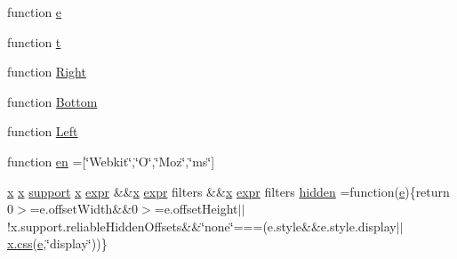 \begin{DoxyCompactItemize}
\item 
function \hyperlink{packages_2j_query_81_810_82_2_content_2_scripts_2jquery-1_810_82_8min_8js_a2c038346d47955cbe2cb91e338edd7e1}{e}
\item 
function \hyperlink{packages_2j_query_81_810_82_2_content_2_scripts_2jquery-1_810_82_8min_8js_a23c5666e83bbbceee94adcd0851f50c4}{t}
\item 
function \hyperlink{packages_2j_query_81_810_82_2_content_2_scripts_2jquery-1_810_82_8min_8js_ac7f66efc33d974809d85fc5bdb00c6eb}{Right}
\item 
function \hyperlink{packages_2j_query_81_810_82_2_content_2_scripts_2jquery-1_810_82_8min_8js_aff76c1cba4a00c678dfce0e0c5a5538a}{Bottom}
\item 
function \hyperlink{packages_2j_query_81_810_82_2_content_2_scripts_2jquery-1_810_82_8min_8js_abef68bf244a1159a49fe3a2c153a65d2}{Left}
\item 
function \hyperlink{packages_2j_query_81_810_82_2_content_2_scripts_2jquery-1_810_82_8min_8js_a5d7a777130eac935addcf4926a74b23c}{en} =\mbox{[}\char`\"{}Webkit\char`\"{},\char`\"{}O\char`\"{},\char`\"{}Moz\char`\"{},\char`\"{}ms\char`\"{}\mbox{]}
\item 
\hyperlink{packages_2j_query_81_810_82_2_content_2_scripts_2jquery-1_810_82_8min_8js_a5ce50d751c9664d05375c8f5080ed43e}{x} \hyperlink{packages_2j_query_81_810_82_2_content_2_scripts_2jquery-1_810_82_8min_8js_a5ce50d751c9664d05375c8f5080ed43e}{x} \hyperlink{jquery-1_810_82-vsdoc_8js_a1be69652377630fc5432ae5ec6463744}{support} \hyperlink{packages_2j_query_81_810_82_2_content_2_scripts_2jquery-1_810_82_8min_8js_a5ce50d751c9664d05375c8f5080ed43e}{x} \hyperlink{jquery-1_810_82-vsdoc_8js_aaacd1d5b3593ba4dfff6d67d4f6cfda1}{expr} \&\&\hyperlink{packages_2j_query_81_810_82_2_content_2_scripts_2jquery-1_810_82_8min_8js_a5ce50d751c9664d05375c8f5080ed43e}{x} \hyperlink{jquery-1_810_82-vsdoc_8js_aaacd1d5b3593ba4dfff6d67d4f6cfda1}{expr} filters \&\&\hyperlink{packages_2j_query_81_810_82_2_content_2_scripts_2jquery-1_810_82_8min_8js_a5ce50d751c9664d05375c8f5080ed43e}{x} \hyperlink{jquery-1_810_82-vsdoc_8js_aaacd1d5b3593ba4dfff6d67d4f6cfda1}{expr} filters \hyperlink{packages_2j_query_81_810_82_2_content_2_scripts_2jquery-1_810_82_8min_8js_a086b6295ec8d15f090cd7239137a4979}{hidden} =function(\hyperlink{packages_2_respond_81_82_80_2content_2_scripts_2respond_8min_8js_a2c038346d47955cbe2cb91e338edd7e1}{e})\{return 0$>$=e.\+offset\+Width\&\&0$>$=e.\+offset\+Height$\vert$$\vert$!x.\+support.\+reliable\+Hidden\+Offsets\&\&\char`\"{}none\char`\"{}===(e.\+style\&\&e.\+style.\+display$\vert$$\vert$\hyperlink{jquery-1_810_82-vsdoc_8js_aa8c6af259210b33d20642f8ee70cbfa4}{x.\+css}(\hyperlink{packages_2_respond_81_82_80_2content_2_scripts_2respond_8min_8js_a2c038346d47955cbe2cb91e338edd7e1}{e},\char`\"{}display\char`\"{}))\}

\end{DoxyCompactItemize}
